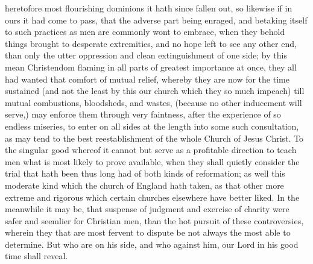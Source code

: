 heretofore most flourishing dominions it hath since fallen out, so likewise if in ours it had come to pass, that the adverse part being enraged, and betaking itself to such practices as men are commonly wont to embrace, when they behold things brought to desperate extremities, and no hope left to see any other end, than only the utter oppression and clean extinguishment of one side; by this mean Christendom flaming in all parts of greatest importance at once, they all had wanted that comfort of mutual relief, whereby they are now for the time sustained (and not the least by this our church which they so much impeach) till mutual combustions, bloodsheds, and wastes, (because no other inducement will serve,) may enforce them through very faintness, after the experience of so endless miseries, to enter on all sides at the length into some such consultation, as may tend to the best reestablishment of the whole Church of Jesus Christ. To the singular good whereof it cannot but serve as a profitable direction to teach men what is most likely to prove available, when they shall quietly consider the trial that hath been thus long had of both kinds of reformation; as  well this moderate kind which the church of England hath taken, as that other more extreme and rigorous which certain churches elsewhere have better liked. In the meanwhile it may be, that suspense of judgment and exercise of charity were safer and seemlier for Christian men, than the hot pursuit of these controversies, wherein they that are most fervent to dispute be not always the most able to determine. But who are on his side, and who against him, our Lord in his good time shall reveal.

